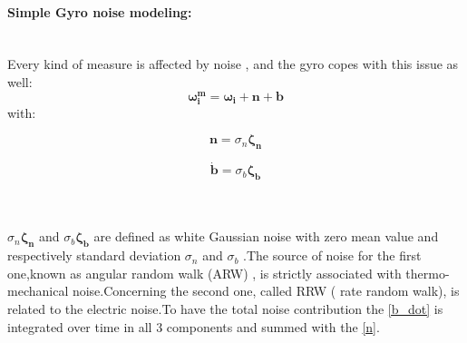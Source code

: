 \documentclass[11pt]{article}
\begin{document}
\paragraph{Simple Gyro noise modeling:\\\\}
Every kind of measure is affected by noise , and the gyro copes with this issue as well:
\begin{equation}
\boldsymbol{\omega_{i}^m}=\boldsymbol{\omega_i+n+b}
\end{equation}
with:\\
\begin{minipage}{.5\textwidth}
\begin{equation}
\mathbf{n}=\sigma_n \mathbf{\zeta_n}
\label{n}
\end{equation}
\end{minipage}
\begin{minipage}{.5\textwidth}
\begin{equation}
\mathbf{\dot{b}}=\sigma_b \mathbf{\zeta_b}
\label{b_dot}
\end{equation}
\end{minipage}\\\\
$\sigma_n \mathbf{\zeta_n}$ and $\sigma_b \mathbf{\zeta_b}$  are defined as white Gaussian noise with zero mean value and respectively  standard deviation $\sigma_n$ and  $\sigma_b $ .The source of noise for the first one,known as angular random walk (ARW) , is strictly associated with thermo-mechanical noise.Concerning the second one, called RRW ( rate random walk), is related to the electric noise.To have the total noise contribution the \ref{b_dot} is integrated over time in all 3 components and summed with the \ref{n}.
\end{document}
